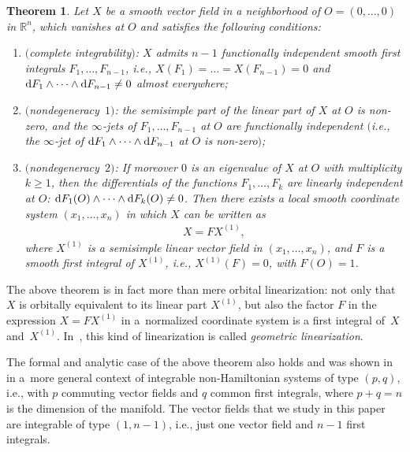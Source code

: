 \documentclass[pdftex]{sigma}
\numberwithin{equation}{section}
\newtheorem{thm}{Theorem}[section]
\newcommand{\bbR}{\mathbb R}
\begin{document}
\begin{thm} \label{thm:SmoothLinearization}
Let $X$ be a smooth vector field in a neighborhood of $O = (0,\dots,0)$ in $\bbR^n$,
which vanishes at $O$ and satisfies the following conditions:
\begin{enumerate}\itemsep=0pt
\item[$i)$] $($complete integrability$)$: $X$ admits $n-1$ functionally independent smooth first integrals $F_1,\dots, F_{n-1}$,
i.e., $X(F_1) = \dots = X(F_{n-1}) = 0$ and ${\rm d}F_1 \wedge \dots \wedge {\rm d}F_{n-1} \neq 0$ almost everywhere;
\item[$ii)$] $($nondegeneracy~$1)$: the semisimple part of the linear part of $X$ at $O$ is non-zero, and the $\infty$-jets
of $F_1,\dots,F_{n-1}$ at $O$ are functionally independent $($i.e.,
the $\infty$-jet of ${\rm d}F_1 \wedge \dots \wedge {\rm d}F_{n-1}$ at $O$ is non-zero$)$;
\item[$iii)$] $($nondegeneracy~$2)$: If moreover $0$ is an eigenvalue of $X$ at $O$ with multiplicity $k \geq 1$,
then the differentials of the functions $F_1,\dots, F_k$ are linearly independent at $O$:
 ${\rm d}F_1(O) \wedge \dots \wedge {\rm d}F_k(O) \neq 0$. Then there exists a local smooth coordinate system $(x_1,\dots,x_n)$ in which $X$ can be written as
\begin{gather*}
X = F X^{(1)},
\end{gather*}
where $X^{(1)}$ is a semisimple linear vector field in $(x_1,\dots,x_n)$, and $F$ is a smooth first integral of $X^{(1)}$, i.e., $X^{(1)}(F) = 0$, with $F(O)=1$.
\end{enumerate}
\end{thm}

The above theorem is in fact more than mere orbital linearization: not only that $X$ is orbitally equivalent to its linear part
$X^{(1)}$, but also the factor $F$ in the expression $X = FX^{(1)}$ in a~normalized coordinate system is a
f\/irst integral of~$X$ and~$X^{(1)}$. In~\cite{Zung-Nondegenerate2015}, this kind of linearization is called
\textit{geometric linearization}.

The formal and analytic case of the above theorem also holds and was shown in \cite{Zung-Nondegenerate2015}
in a~more general context of integrable non-Hamiltonian systems of type $(p,q)$, i.e., with $p$ commuting
vector f\/ields and $q$ common f\/irst integrals, where $p+q = n$ is the dimension of the manifold. The vector f\/ields
that we study in this paper are integrable of type $(1,n-1)$, i.e., just one vector f\/ield and $n-1$ f\/irst integrals.
\end{document}
